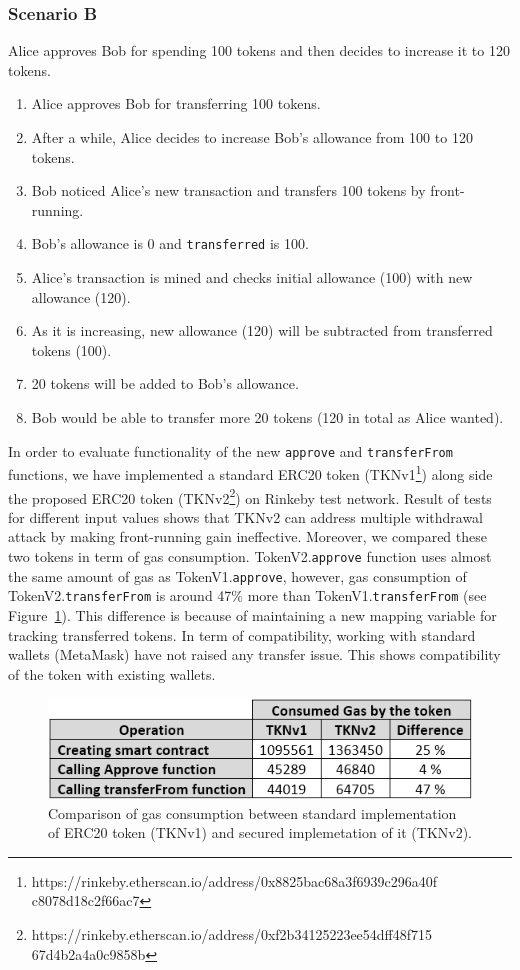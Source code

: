 \subsubsection*{Scenario B} Alice approves Bob for spending 100 tokens and then decides to increase it to 120 tokens.
\begin{enumerate}
	\item Alice approves Bob for transferring 100 tokens.
	\item After a while, Alice decides to increase Bob’s allowance from 100 to 120 tokens.
	\item Bob noticed Alice’s new transaction and transfers 100 tokens by front-running.
	\item Bob’s allowance is 0 and \texttt{transferred} is 100.
	\item Alice’s transaction is mined and checks initial allowance (100) with new allowance (120).
	\item As it is increasing, new allowance (120) will be subtracted from transferred tokens (100).
	\item 20 tokens will be added to Bob’s allowance.
	\item Bob would be able to transfer more 20 tokens (120 in total as Alice wanted).\newline
\end{enumerate}

In order to evaluate functionality of the new \texttt{approve} and \texttt{transferFrom} functions, we have implemented a standard ERC20 token (TKNv1\footnote{https://rinkeby.etherscan.io/address/0x8825bac68a3f6939c296a40f c8078d18c2f66ac7}) along side the proposed ERC20 token (TKNv2\footnote{https://rinkeby.etherscan.io/address/0xf2b34125223ee54dff48f715 67d4b2a4a0c9858b}) on Rinkeby test network. Result of tests for different input values shows that TKNv2 can address multiple withdrawal attack by making front-running gain ineffective. Moreover, we compared these two tokens in term of gas consumption. TokenV2.\texttt{approve} function uses almost the same amount of gas as TokenV1.\texttt{approve}, however, gas consumption of TokenV2.\texttt{transferFrom} is around 47\% more than TokenV1.\texttt{transferFrom} (see Figure~\ref{fig:gas}). This difference is because of maintaining a new mapping variable for tracking transferred tokens. In term of compatibility, working with standard wallets (\eg MetaMask) have not raised any transfer issue. This shows compatibility of the token with existing wallets.

\begin{figure}[t]
	\centering
	\includegraphics[width=1.0\linewidth]{figures/multiple_withdrawal_22.png}
	\caption{Comparison of gas consumption between standard implementation of ERC20 token (TKNv1) and secured implemetation of it (TKNv2).\label{fig:gas}}
\end{figure}

